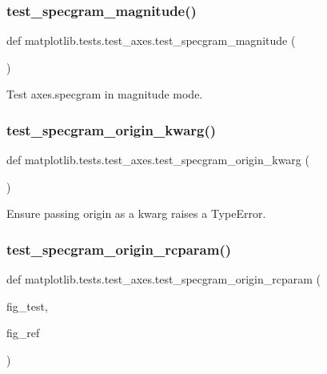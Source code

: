 \subsubsection{\texorpdfstring{test\+\_\+specgram\+\_\+magnitude()}{test\_specgram\_magnitude()}}
{\footnotesize\ttfamily def matplotlib.\+tests.\+test\+\_\+axes.\+test\+\_\+specgram\+\_\+magnitude (\begin{DoxyParamCaption}{ }\end{DoxyParamCaption})}

\begin{DoxyVerb}Test axes.specgram in magnitude mode.\end{DoxyVerb}
 \mbox{\label{namespacematplotlib_1_1tests_1_1test__axes_a9d43d34c8d202b7fef3b8f85dbc5a52b}} 
\subsubsection{\texorpdfstring{test\+\_\+specgram\+\_\+origin\+\_\+kwarg()}{test\_specgram\_origin\_kwarg()}}
{\footnotesize\ttfamily def matplotlib.\+tests.\+test\+\_\+axes.\+test\+\_\+specgram\+\_\+origin\+\_\+kwarg (\begin{DoxyParamCaption}{ }\end{DoxyParamCaption})}

\begin{DoxyVerb}Ensure passing origin as a kwarg raises a TypeError.\end{DoxyVerb}
 \mbox{\label{namespacematplotlib_1_1tests_1_1test__axes_acec6383a70126a71095e0bd77bb74a1c}} 
\subsubsection{\texorpdfstring{test\+\_\+specgram\+\_\+origin\+\_\+rcparam()}{test\_specgram\_origin\_rcparam()}}
{\footnotesize\ttfamily def matplotlib.\+tests.\+test\+\_\+axes.\+test\+\_\+specgram\+\_\+origin\+\_\+rcparam (\begin{DoxyParamCaption}\item[{}]{fig\+\_\+test,  }\item[{}]{fig\+\_\+ref }\end{DoxyParamCaption})}

